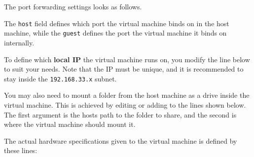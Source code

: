 The port forwarding settings looks as follows.

\begin{Shaded}
\begin{Highlighting}[numbers=left,,]
\end{Highlighting}
\end{Shaded}

The \texttt{host} field defines which port the virtual machine binds on
in the host machine, while the \texttt{guest} defines the port the
virtual machine it binds on internally.

To define which \textbf{local IP} the virtual machine runs on, you
modify the line below to suit your needs. Note that the IP must be
unique, and it is recommended to stay inside the \texttt{192.168.33.x}
subnet.

\begin{Shaded}
\begin{Highlighting}[numbers=left,,]
\end{Highlighting}
\end{Shaded}

You may also need to mount a folder from the host machine as a drive
inside the virtual machine. This is achieved by editing or adding to the
lines shown below. The first argument is the hosts path to the folder to
share, and the second is where the virtual machine should mount it.

\begin{Shaded}
\begin{Highlighting}[numbers=left,,]
\NormalTok{, }
\NormalTok{, }
\end{Highlighting}
\end{Shaded}

The actual hardware specifications given to the virtual machine is
defined by these lines:


